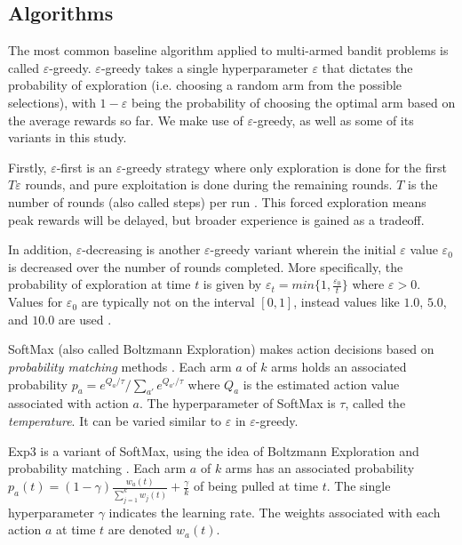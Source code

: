 \documentclass{article}
\begin{document}
\subsection{Algorithms} \label{sec:algos}

The most common baseline algorithm applied to multi-armed bandit problems is called $\varepsilon$-greedy. $\varepsilon$-greedy takes a single hyperparameter $\varepsilon$ 
that dictates the probability of exploration (i.e. choosing a random arm from the possible selections), with $1-\varepsilon$ being the probability of choosing the optimal 
arm based on the average rewards so far. We make use of $\varepsilon$-greedy, as well as some of its variants in this study. 

Firstly, $\varepsilon$-first is an $\varepsilon$-greedy strategy where only exploration is done for the first $T\varepsilon$ rounds, and pure exploitation 
is done during the remaining rounds. $T$ is the number of rounds (also called steps) per run \cite{mab_algos}. This forced exploration means peak rewards will be delayed, 
but broader experience is gained as a tradeoff.

In addition, $\varepsilon$-decreasing is another $\varepsilon$-greedy variant wherein the initial $\varepsilon$ value $\varepsilon_0$ is decreased over the number of rounds 
completed. More specifically, the probability of exploration at time $t$ is given by $\varepsilon_t = min\{ 1, \frac{\varepsilon_0}{t}\}$ where $\varepsilon > 0$. Values for 
$\varepsilon_0$ are typically not on the interval $[0,1]$, instead values like $1.0$, $5.0$, and $10.0$ are used \cite{mab_algos}. 

SoftMax (also called Boltzmann Exploration) makes action decisions based on \emph{probability matching} methods \cite{mab_algos}. Each arm $a$ of $k$ arms holds an associated 
probability $p_a = e^{Q_a/\tau}/\sum_{a'}e^{Q_{a'}/\tau}$ where $Q_a$ is the estimated action value associated with action $a$. The hyperparameter of SoftMax is $\tau$, 
called the \emph{temperature}. It can be varied similar to $\varepsilon$ in $\varepsilon$-greedy.

Exp3 is a variant of SoftMax, using the idea of Boltzmann Exploration and probability matching \cite{mab_algos}. Each arm $a$ of $k$ arms has an associated probability 
$p_a(t) = (1-\gamma) \frac{w_a(t)}{\sum_{j=1}^k w_j(t)} + \frac{\gamma}{k}$ of being pulled at time $t$. The single hyperparameter $\gamma$ indicates the learning 
rate. The weights associated with each action $a$ at time $t$ are denoted $w_a(t)$.
\end{document}
